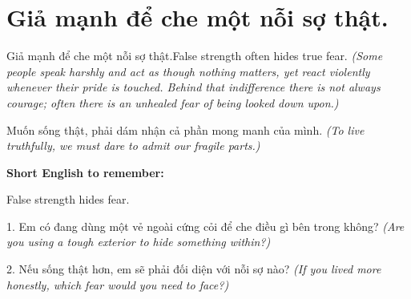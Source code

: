 \section{Giả mạnh để che một nỗi sợ thật.}
\begin{truyen}{Giả mạnh để che một nỗi sợ thật.}{False strength often hides true fear.}
\textit{(Some people speak harshly and act as though nothing matters, yet react violently whenever their pride is touched. Behind that indifference there is not always courage; often there is an unhealed fear of being looked down upon.)}
\end{truyen}
\begin{baihoc}
Muốn sống thật, phải dám nhận cả phần mong manh của mình.
\textit{(To live truthfully, we must dare to admit our fragile parts.)}
\end{baihoc}
\begin{ghinhoanh}
\textbf{Short English to remember:}

False strength hides fear.
\end{ghinhoanh}
\begin{tuhocnhanh}
1. Em có đang dùng một vẻ ngoài cứng cỏi để che điều gì bên trong không? \textit{(Are you using a tough exterior to hide something within?)}

2. Nếu sống thật hơn, em sẽ phải đối diện với nỗi sợ nào? \textit{(If you lived more honestly, which fear would you need to face?)}
\end{tuhocnhanh}
\ngancach

